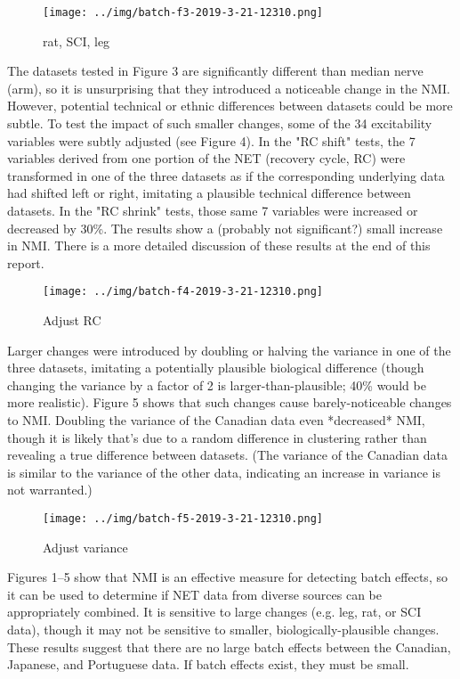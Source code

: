 \documentclass[12pt]{article}
\begin{document}
\begin{figure*}
  \centering
       \texttt{[image: ../img/batch-f3-2019-3-21-12310.png]}
  \caption{rat, SCI, leg}
  \label{fig:MI}
\end{figure*}

The datasets tested in Figure 3 are significantly different than median nerve (arm), so it is unsurprising that they introduced a noticeable change in the NMI. However, potential technical or ethnic differences between datasets could be more subtle. To test the impact of such smaller changes, some of the 34 excitability variables were subtly adjusted (see Figure 4). In the "RC shift" tests, the 7 variables derived from one portion of the NET (recovery cycle, RC) were transformed in one of the three datasets as if the corresponding underlying data had shifted left or right, imitating a plausible technical difference between datasets. In the "RC shrink" tests, those same 7 variables were increased or decreased by 30\%. %
The results show a (probably not significant?) small increase in NMI. There is a more detailed discussion of these results at the end of this report.

\begin{figure*}
  \centering
       \texttt{[image: ../img/batch-f4-2019-3-21-12310.png]}
  \caption{Adjust RC}
  \label{fig:MI}
\end{figure*}

Larger changes were introduced by doubling or halving the variance in one of the three datasets, imitating a potentially plausible biological difference (though changing the variance by a factor of 2 is larger-than-plausible; 40\% would be more realistic). Figure 5 shows that such changes cause barely-noticeable changes to NMI. Doubling the variance of the Canadian data even *decreased* NMI, though it is likely that's due to a random difference in clustering rather than revealing a true difference between datasets. (The variance of the Canadian data is similar to the variance of the other data, indicating an increase in variance is not warranted.)

\begin{figure*}
  \centering
       \texttt{[image: ../img/batch-f5-2019-3-21-12310.png]}
  \caption{Adjust variance}
  \label{fig:MI}
\end{figure*}

Figures 1–5 show that NMI is an effective measure for detecting batch effects, so it can be used to determine if NET data from diverse sources can be appropriately combined. It is sensitive to large changes (e.g. leg, rat, or SCI data), though it may not be sensitive to smaller, biologically-plausible changes. These results suggest that there are no large batch effects between the Canadian, Japanese, and Portuguese data. If batch effects exist, they must be small. %
\end{document}
